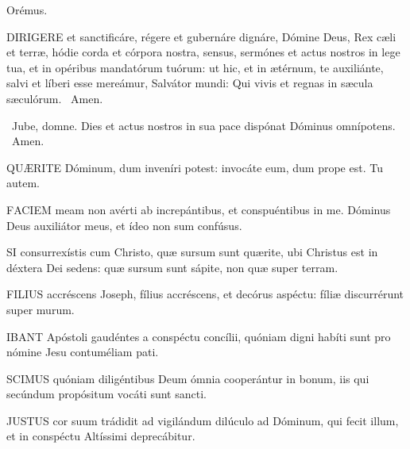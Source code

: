 Orémus. 

\lettrine[lines=2]{D}{IRIGERE} et sanctificáre, régere et gubernáre dignáre, Dómine Deus, Rex cæli et terræ, hódie corda et córpora nostra, sensus, sermónes et actus nostros in lege tua, et in opéribus mandatórum tuórum: ut hic, et in ætérnum, te auxiliánte, salvi et líberi esse mereámur, Salvátor mundi: Qui vivis et regnas in sæcula sæculórum. \R\ Amen.

\V\ Jube, domne.  Dies et actus nostros in sua pace dispónat Dóminus omnípotens. \R\ Amen.



\lettrine[lines=2]{Q}{UÆRITE} Dóminum, dum inveníri potest: invocáte eum, dum prope est. Tu autem.


\lettrine[lines=2]{F}{ACIEM} meam non avérti ab increpántibus, et conspuéntibus in me. Dóminus Deus auxiliátor meus, et ídeo non sum confúsus.


\lettrine[lines=2]{S}{I} consurrexístis cum Christo, quæ sursum sunt quærite, ubi Christus est in déxtera Dei sedens: quæ sursum sunt sápite, non quæ super terram.



\lettrine[lines=2]{F}{ILIUS} accréscens Joseph, fílius accréscens, et decórus aspéctu: fíliæ discurrérunt super murum.



\lettrine[lines=2]{I}{BANT} Apóstoli gaudéntes a conspéctu concílii, quóniam digni habíti sunt pro nómine Jesu contuméliam pati.


\lettrine[lines=2]{S}{CIMUS} quóniam diligéntibus Deum ómnia cooperántur in bonum, iis qui secúndum propósitum vocáti sunt sancti.


\lettrine[lines=2]{J}{USTUS} cor suum trádidit ad vigilándum dilúculo ad Dóminum, qui fecit illum, et in conspéctu Altíssimi deprecábitur.

